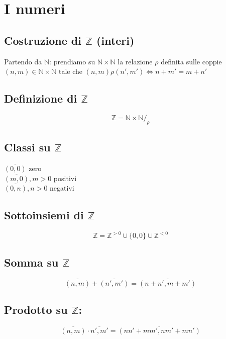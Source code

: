 \section{I numeri}
\subsection{Costruzione di \(\mathbb{Z}\) (interi)} 
Partendo da \(\mathbb{N}\): prendiamo su \(\mathbb{N}\times\mathbb{N}\) la relazione \(\rho\) definita sulle coppie \((n, m)\in \mathbb{N}\times\mathbb{N}\) tale che \((n, m)\rho (n',m') \Leftrightarrow n+m'=m+n'\)

\subsection{Definizione di \(\mathbb{Z}\)} 
\[\mathbb{Z}=\mathbb{N}\times\mathbb{N}/_{\rho}\]

\subsection{Classi su \(\mathbb{Z}\)} 
\(\overline{(0,0)}\) zero
\\\(\overline{(m, 0)}, m>0\) positivi
\\\(\overline{(0, n)}, n>0\) negativi

\subsection{Sottoinsiemi di \(\mathbb{Z}\)} 
\[\mathbb{Z}=\mathbb{Z}^{>0}\cup\{0,0\}\cup\mathbb{Z}^{<0}\]

\subsection{Somma su \(\mathbb{Z}\)}
\[\overline{(n,m)}+\overline{(n',m')}=\overline{(n+n',m+m')}\]

\subsection{Prodotto su \(\mathbb{Z}\):}
\[\overline{(n,m)}\cdot\overline{n',m'}=\overline{(nn'+mm', nm'+mn')}\]


